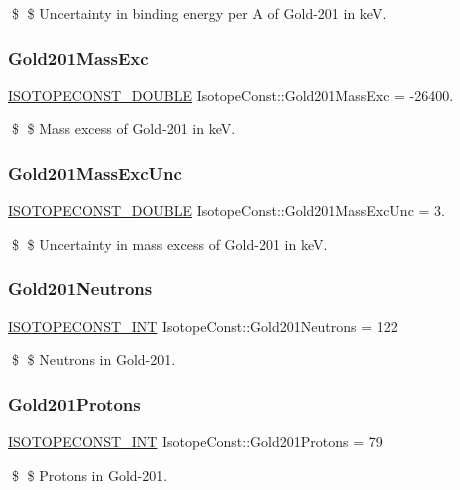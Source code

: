 \$ \$ Uncertainty in binding energy per A of Gold-\/201 in keV. \mbox{\label{group___isotope_const-_gold-_au201_ga098bb0cadb033058813deb98d173d576}} 
\subsubsection{\texorpdfstring{Gold201\+Mass\+Exc}{Gold201MassExc}}
{\footnotesize\ttfamily \mbox{\hyperlink{group___isotope_const-_macros_ga8f45a7272ce02c0b4c65c44636ed719a}{I\+S\+O\+T\+O\+P\+E\+C\+O\+N\+S\+T\+\_\+\+D\+O\+U\+B\+LE}} Isotope\+Const\+::\+Gold201\+Mass\+Exc = -\/26400.}

\$ \$ Mass excess of Gold-\/201 in keV. \mbox{\label{group___isotope_const-_gold-_au201_ga50c06852ab56fccc85d449c418d0a24d}} 
\subsubsection{\texorpdfstring{Gold201\+Mass\+Exc\+Unc}{Gold201MassExcUnc}}
{\footnotesize\ttfamily \mbox{\hyperlink{group___isotope_const-_macros_ga8f45a7272ce02c0b4c65c44636ed719a}{I\+S\+O\+T\+O\+P\+E\+C\+O\+N\+S\+T\+\_\+\+D\+O\+U\+B\+LE}} Isotope\+Const\+::\+Gold201\+Mass\+Exc\+Unc = 3.}

\$ \$ Uncertainty in mass excess of Gold-\/201 in keV. \mbox{\label{group___isotope_const-_gold-_au201_ga16103a466f1dc402edbeaa1b10897777}} 
\subsubsection{\texorpdfstring{Gold201\+Neutrons}{Gold201Neutrons}}
{\footnotesize\ttfamily \mbox{\hyperlink{group___isotope_const-_macros_ga5f18360b3e99483a35c32d789e62621c}{I\+S\+O\+T\+O\+P\+E\+C\+O\+N\+S\+T\+\_\+\+I\+NT}} Isotope\+Const\+::\+Gold201\+Neutrons = 122}

\$ \$ Neutrons in Gold-\/201. \mbox{\label{group___isotope_const-_gold-_au201_gae0c912e5f3824abdb7f0fda86c307e7b}} 
\subsubsection{\texorpdfstring{Gold201\+Protons}{Gold201Protons}}
{\footnotesize\ttfamily \mbox{\hyperlink{group___isotope_const-_macros_ga5f18360b3e99483a35c32d789e62621c}{I\+S\+O\+T\+O\+P\+E\+C\+O\+N\+S\+T\+\_\+\+I\+NT}} Isotope\+Const\+::\+Gold201\+Protons = 79}

\$ \$ Protons in Gold-\/201. 